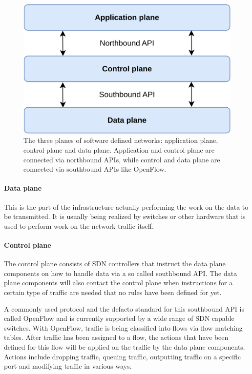 \begin{figure}[h]
  \centering
  \includegraphics[width=\linewidth]{images/chapter_2/sdn.png}
  \caption[Software defined networking (SDN)]{The three planes of software defined networks: application plane, control plane and data plane. Application and control plane are connected via northbound APIs, while control and data plane are connected via southbound APIs like OpenFlow.}
  \label{fig:sdn}
\end{figure}

\paragraph{Data plane} This is the part of the infrastructure actually performing the work on the data to be transmitted. It is usually being realized by switches or other hardware that is used to perform work on the network traffic itself.

\paragraph{Control plane} The control plane consists of SDN controllers that instruct the data plane components on how to handle data via a so called southbound API. The data plane components will also contact the control plane when instructions for a certain type of traffic are needed that no rules have been defined for yet.

A commonly used protocol and the defacto standard for this southbound API is called OpenFlow \cite{openflow} and is currently supported by a wide range of SDN capable switches. With OpenFlow, traffic is being classified into flows via flow matching tables. After traffic has been assigned to a flow, the actions that have been defined for this flow will be applied on the traffic by the data plane components. Actions include dropping traffic, queuing traffic, outputting traffic on a specific port and modifying traffic in various ways.

